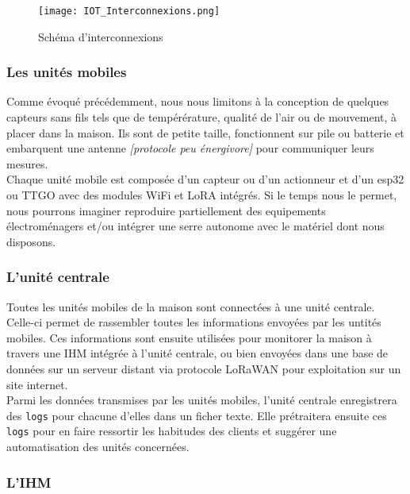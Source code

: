 \documentclass[11pt]{scrartcl} %
\begin{document}
\begin{figure}[h] %
	\centering
	\texttt{[image: IOT\_Interconnexions.png]} %
	\caption{Schéma d'interconnexions}
\end{figure}


\subsubsection{Les unités mobiles}

Comme évoqué précédemment, nous nous limitons à la conception de quelques capteurs sans fils tels que de tempérérature, qualité de l'air ou de mouvement, à placer dans la maison. Ils sont de petite taille, fonctionnent sur pile ou batterie et embarquent une antenne \textit{[protocole peu énergivore]} pour communiquer leurs mesures.\\
Chaque unité mobile est composée d'un capteur ou d'un actionneur et  d'un esp32 ou TTGO avec des modules WiFi et LoRA intégrés.
Si le temps nous le permet, nous pourrons imaginer reproduire partiellement des equipements électroménagers et/ou intégrer une serre autonome avec le matériel dont nous disposons.

\subsubsection{L'unité centrale}

Toutes les unités mobiles de la maison sont connectées à une unité centrale. Celle-ci permet de rassembler toutes les informations envoyées par les untités mobiles. Ces informations sont ensuite utilisées pour monitorer la maison à travers une IHM intégrée à l'unité centrale, ou bien envoyées dans une base de données sur un serveur distant via protocole LoRaWAN pour exploitation sur un 
site internet.\\
Parmi les données transmises par les unités mobiles, l'unité centrale enregistrera des \texttt{logs} pour chacune d'elles dans un ficher texte. Elle prétraitera ensuite ces \texttt{logs} pour en faire ressortir les habitudes des clients et suggérer une automatisation des unités concernées.

\subsubsection{L'IHM}
\end{document}

